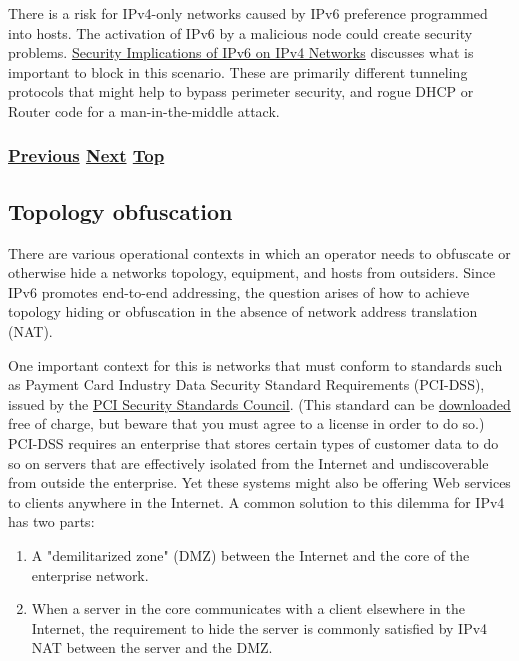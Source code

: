 \documentclass[
]{article}
\begin{document}
There is a risk for IPv4-only networks caused by IPv6 preference
programmed into hosts. The activation of IPv6 by a malicious node could
create security problems.
\href{https://www.rfc-editor.org/info/rfc7123}{Security Implications of
IPv6 on IPv4 Networks} discusses what is important to block in this
scenario. These are primarily different tunneling protocols that might
help to bypass perimeter security, and rogue DHCP or Router code for a
man-in-the-middle attack.

\subsubsection{\texorpdfstring{\hyperref[layer-2-considerations]{Previous}
\hyperref[topology-obfuscation]{Next}
\hyperref[security]{Top}}{Previous Next Top}}\label{previous-next-top-23}

\pagebreak

\subsection{Topology obfuscation}\label{topology-obfuscation}

There are various operational contexts in which an operator needs to
obfuscate or otherwise hide a network\textquotesingle s topology,
equipment, and hosts from outsiders. Since IPv6 promotes end-to-end
addressing, the question arises of how to achieve topology hiding or
obfuscation in the absence of network address translation (NAT).

One important context for this is networks that must conform to
standards such as Payment Card Industry Data Security Standard
Requirements (PCI-DSS), issued by the
\href{https://www.pcisecuritystandards.org}{PCI Security Standards
Council}. (This standard can be
\href{https://docs-prv.pcisecuritystandards.org/PCI\%20DSS/Standard/PCI-DSS-v4_0.pdf}{downloaded}
free of charge, but beware that you must agree to a license in order to
do so.) PCI-DSS requires an enterprise that stores certain types of
customer data to do so on servers that are effectively isolated from the
Internet and undiscoverable from outside the enterprise. Yet these
systems might also be offering Web services to clients anywhere in the
Internet. A common solution to this dilemma for IPv4 has two parts:

\begin{enumerate}
\def\labelenumi{\arabic{enumi}.}
\item
  A "demilitarized zone" (DMZ) between the Internet and the core of the
  enterprise network.
\item
  When a server in the core communicates with a client elsewhere in the
  Internet, the requirement to hide the server is commonly satisfied by
  IPv4 NAT between the server and the DMZ.
\end{enumerate}
\end{document}
